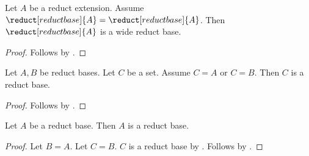 \begin{proposition}\label{reduct_wide_local_projection}
    Let $A$ be a reduct extension.
    Assume $\reduct[reduct base]{A}=\reduct[reduct base]{A}$.
    Then $\reduct[reduct base]{A}$ is a wide reduct base.
\end{proposition}
\begin{proof}
    Follows by .
\end{proof}

\begin{proposition}\label{reduct_predicate_substitution_plain}
    Let $A,B$ be reduct bases.
    Let $C$ be a set.
    Assume $C=A$ or $C=B$.
    Then $C$ is a reduct base.
\end{proposition}
\begin{proof}
    Follows by \auto.
\end{proof}

\begin{proposition}\label{reduct_local_alias_chain}
    Let $A$ be a reduct base.
    Then $A$ is a reduct base.
\end{proposition}
\begin{proof}
    Let $B=A$.
    Let $C=B$.
    $C$ is a reduct base by \auto.
    Follows by \auto.
\end{proof}
